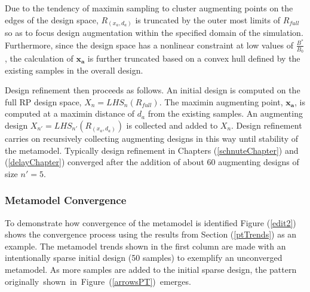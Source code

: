 %
Due to the tendency of maximin sampling to cluster augmenting points on the edges
of the design space, $R_{(x_a, d_a)}$ is truncated by the outer most limits of
$R_{full}$ so as to focus design augmentation within the specified domain of the
simulation. Furthermore, since the design space has a nonlinear constraint at low
values of $\frac{B^*}{B_0}$, the calculation of $\bm{x_a}$ is further truncated
based on a convex hull defined by the existing samples in the overall design.

%
Design refinement then proceeds as follows. An initial design is computed on the 
full RP design space, $X_{n} = LHS_{n}(R_{full})$. %
The maximin augmenting point, $\bm{x_a}$, is computed at a maximin distance of $d_a$ 
from the existing samples. An augmenting design $X_{n'} = LHS_{n'}(R_{(x_a, d_a)})$ 
is collected and added to $X_n$. Design refinement carries on recursively 
collecting augmenting designs in this way until %
stability of the metamodel. Typically design refinement in Chapters (\ref{schnuteChapter}) 
and (\ref{delayChapter}) converged after the addition of about 60 augmenting designs of size $n'=5$.

\subsubsection{Metamodel Convergence\label{converge}}

%
To demonstrate how convergence of the metamodel is identified %
Figure (\ref{edit2}) shows the convergence process using the results from Section (\ref{ptTrends})
as an example. The  metamodel trends shown in the first column %
are made with an intentionally sparse initial design (50 samples) to exemplify 
an unconverged metamodel. As more samples are added to the initial sparse 
design, the pattern \mbox{originally shown in Figure (\ref{arrowsPT}) emerges.} %

